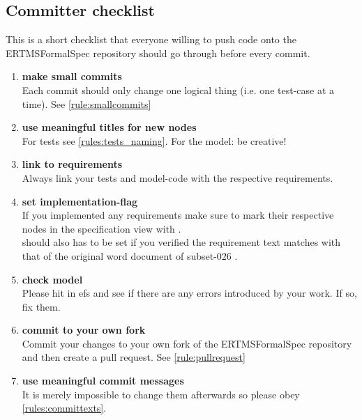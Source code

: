 \documentclass[draft]{efsguide}
\begin{document}
\begin{appendices}

\chapter{Committer checklist}
\label{appendix:committer_checklist}
This is a short checklist that everyone willing to push code onto the ERTMSFormalSpec repository should go through before every commit.

\begin{enumerate}

\item \textbf{make small commits}\\
Each commit should only change one logical thing (i.e. one test-case at a time). See \ref{rule:smallcommits} 
\item \textbf{use meaningful titles for new nodes}\\
For tests see \ref{rules:tests_naming}. For the model: be creative! 
\item \textbf{link to requirements}\\
Always link your tests and model-code with the respective requirements. 
\item \textbf{set implementation-flag}\\
If you implemented any requirements make sure to mark their respective nodes in the specification view with .\\  should also has to be set if you verified the requirement text matches with that of the original word document of subset-026 \cite{subset26}. 
\item \textbf{check model}\\
Please hit  in \gls{efs} and see if there are any errors introduced by your work. If so, fix them. 
\item \textbf{commit to your own fork}\\
Commit your changes to your own fork of the ERTMSFormalSpec repository and then create a pull request. See \ref{rule:pullrequest} 
\item \textbf{use meaningful commit messages}\\
It is merely impossible to change them afterwards so please obey \ref{rules:committexts}. 	
\end{enumerate}

\end{appendices}



{}
\printglossary[style=listdotted]
\newpage

{}


\end{document}
